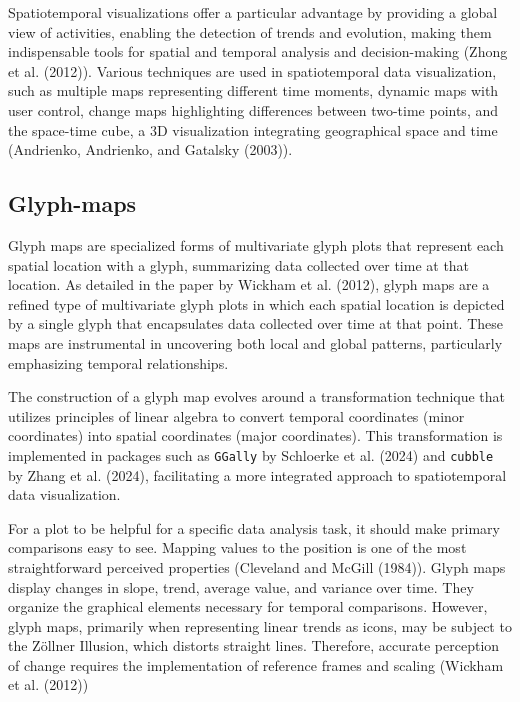 Spatiotemporal visualizations offer a particular advantage by providing a global view of activities, enabling the detection of trends and evolution, making them indispensable tools for spatial and temporal analysis and decision-making (Zhong et al. (2012)). Various techniques are used in spatiotemporal data visualization, such as multiple maps representing different time moments, dynamic maps with user control, change maps highlighting differences between two-time points, and the space-time cube, a 3D visualization integrating geographical space and time (Andrienko, Andrienko, and Gatalsky (2003)).

\hypertarget{glyph-maps}{%
\subsection{Glyph-maps}\label{glyph-maps}}

Glyph maps are specialized forms of multivariate glyph plots that represent each spatial location with a glyph, summarizing data collected over time at that location. As detailed in the paper by Wickham et al. (2012), glyph maps are a refined type of multivariate glyph plots in which each spatial location is depicted by a single glyph that encapsulates data collected over time at that point. These maps are instrumental in uncovering both local and global patterns, particularly emphasizing temporal relationships.

The construction of a glyph map evolves around a transformation technique that utilizes principles of linear algebra to convert temporal coordinates (minor coordinates) into spatial coordinates (major coordinates). This transformation is implemented in packages such as \texttt{GGally} by Schloerke et al. (2024) and \texttt{cubble} by Zhang et al. (2024), facilitating a more integrated approach to spatiotemporal data visualization.

For a plot to be helpful for a specific data analysis task, it should make primary comparisons easy to see. Mapping values to the position is one of the most straightforward perceived properties (Cleveland and McGill (1984)). Glyph maps display changes in slope, trend, average value, and variance over time. They organize the graphical elements necessary for temporal comparisons. However, glyph maps, primarily when representing linear trends as icons, may be subject to the Zöllner Illusion, which distorts straight lines. Therefore, accurate perception of change requires the implementation of reference frames and scaling (Wickham et al. (2012))

